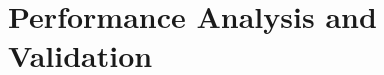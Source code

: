 \chapter{Performance Analysis and Validation}\label{chapter:performance-analysis-validation}

\lipsum[1-5]